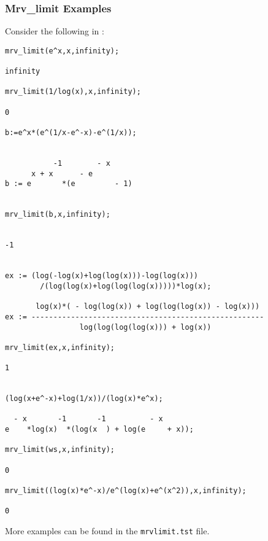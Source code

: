 \subsubsection{Mrv\_limit Examples}
Consider the following in \REDUCE:
\begin{small}
\begin{verbatim}
mrv_limit(e^x,x,infinity);

infinity

mrv_limit(1/log(x),x,infinity);

0

b:=e^x*(e^(1/x-e^-x)-e^(1/x));


           -1        - x
      x + x      - e
b := e       *(e         - 1)


mrv_limit(b,x,infinity);


-1


ex := (log(-log(x)+log(log(x)))-log(log(x)))
        /(log(log(x)+log(log(log(x)))))*log(x);

       log(x)*( - log(log(x)) + log(log(log(x)) - log(x)))
ex := -----------------------------------------------------
                 log(log(log(log(x))) + log(x))

mrv_limit(ex,x,infinity);

1


(log(x+e^-x)+log(1/x))/(log(x)*e^x);

  - x       -1       -1          - x
e    *log(x)  *(log(x  ) + log(e     + x));

mrv_limit(ws,x,infinity);

0

mrv_limit((log(x)*e^-x)/e^(log(x)+e^(x^2)),x,infinity);

0
\end{verbatim}
\end{small}
More examples can be found in the \texttt{mrvlimit.tst} file.

